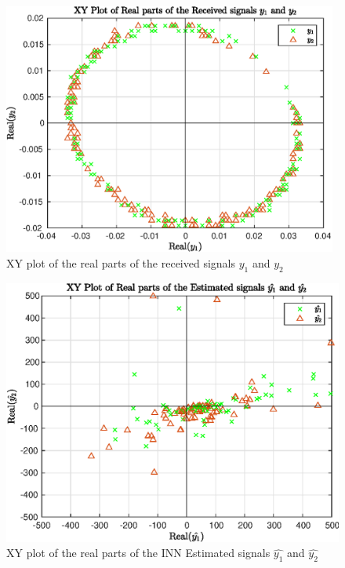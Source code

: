 \begin{figure}[!htb]
    \centering
    \includegraphics[width=11cm]{images/INNyn.eps}
    \caption{XY plot of the real parts of the received signals $y_1$ and $y_2$}
    \label{fig:INNyn}
\end{figure}

\begin{figure}[!htb]
    \centering
    \includegraphics[width=\linewidth]{images/INNResult.eps}
    \caption{XY plot of the real parts of the INN Estimated signals $\hat{y_1}$ and $\hat{y_2}$ }
    \label{fig:INNyResult}
\end{figure}

